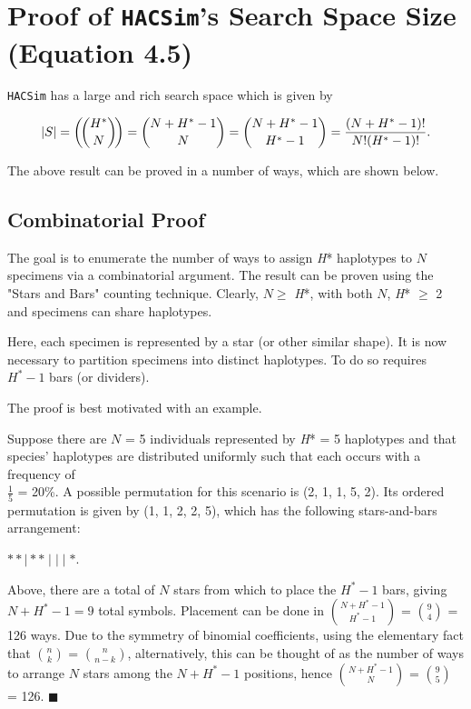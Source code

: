\chapter{Proof of {\tt HACSim}'s Search Space Size (Equation 4.5)}

{\tt HACSim} has a large and rich search space which is given by

\begin{equation}
|S| = \multichoose{H^*}{N} = {{N + H^* - 1}\choose{N}} = {{N + H^* - 1}\choose{H^* - 1}} = \frac{(N + H^* - 1)!}{N!(H^* - 1)!}.
\end{equation}

\noindent The above result can be proved in a number of ways, which are shown below.

\section{Combinatorial Proof}

The goal is to enumerate the number of ways to assign \textit{H}* haplotypes to $N$ specimens via a combinatorial argument. The result can be proven using the "Stars and Bars" counting technique. Clearly, $N \geq$ \textit{H}*, with both $N$, \textit{H}* $\geq$ 2 and specimens can share haplotypes.

\vspace{5mm} 

Here, each specimen is represented by a star (or other similar shape). It is now necessary to partition specimens into distinct haplotypes. To do so requires $H^* - 1$ bars (or dividers). 

\vspace{5mm}

The proof is best motivated with an example.

\vspace{5mm}

Suppose there are $N$ = 5 individuals represented by \textit{H}* = 5 haplotypes and that species' haplotypes are distributed uniformly such that each occurs with a frequency of \\ $\frac{1}{5}$ = 20\%. A possible permutation for this scenario is (2, 1, 1, 5, 2). Its ordered permutation is given by (1, 1, 2, 2, 5), which has the following stars-and-bars arrangement:

\begin{center}
$* * \mid * * \mid \mid \mid *$.
\end{center}

\noindent Above, there are a total of $N$ stars from which to place the $H^* - 1$ bars, giving $N + H^* - 1 = 9$ total symbols. Placement can be done in ${N + H^* - 1}\choose{H^* - 1}$ = ${9}\choose{4}$ = 126 ways. Due to the symmetry of binomial coefficients, using the elementary fact that ${n}\choose{k}$ = ${n}\choose{n-k}$, alternatively, this can be thought of as the number of ways to arrange $N$ stars among the $N + H^* - 1$ positions, hence ${N + H^* - 1}\choose{N}$ = ${9}\choose{5}$ = 126. $\blacksquare$ 


